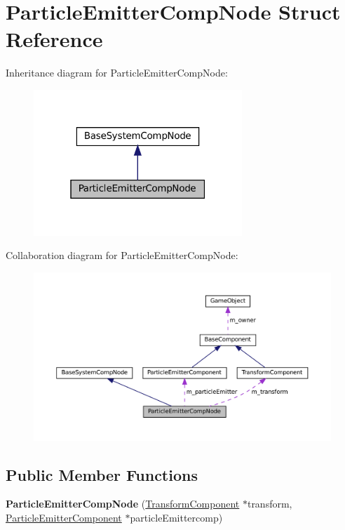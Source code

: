 \hypertarget{structParticleEmitterCompNode}{}\section{Particle\+Emitter\+Comp\+Node Struct Reference}
\label{structParticleEmitterCompNode}


Inheritance diagram for Particle\+Emitter\+Comp\+Node\+:\nopagebreak
\begin{figure}[H]
\begin{center}
\leavevmode
\includegraphics[width=223pt]{structParticleEmitterCompNode__inherit__graph}
\end{center}
\end{figure}


Collaboration diagram for Particle\+Emitter\+Comp\+Node\+:\nopagebreak
\begin{figure}[H]
\begin{center}
\leavevmode
\includegraphics[width=350pt]{structParticleEmitterCompNode__coll__graph}
\end{center}
\end{figure}
\subsection*{Public Member Functions}
\begin{DoxyCompactItemize}
\item 
\mbox{\label{structParticleEmitterCompNode_a2679defaa00600d4179a54e2754c9e07}} 
{\bfseries Particle\+Emitter\+Comp\+Node} (\hyperlink{classTransformComponent}{Transform\+Component} $\ast$transform, \hyperlink{classParticleEmitterComponent}{Particle\+Emitter\+Component} $\ast$particle\+Emittercomp)
\end{DoxyCompactItemize}
